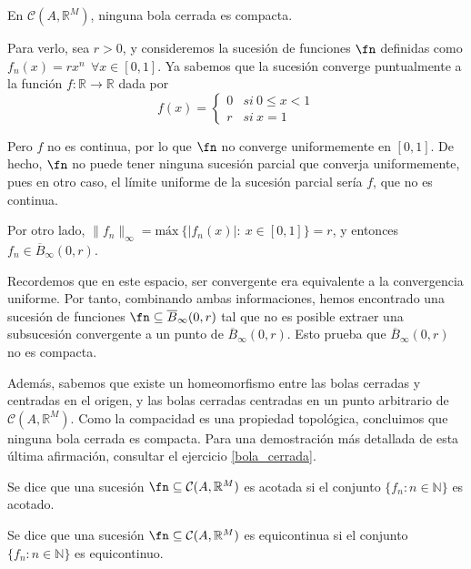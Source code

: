 \begin{ejemplo} En $\mathcal{C}(A,\mathbb{R}^M)$, ninguna bola cerrada es compacta.

  Para verlo, sea $r>0$, y consideremos la sucesión de funciones $\fn$ definidas como $f_n(x) = rx^n \ \ \forall x \in [0,1]$. Ya sabemos que la sucesión converge puntualmente a la función $f: \mathbb{R} \to \mathbb{R}$ dada por $$f(x) = \begin{cases} 0 & si\ 0 \le x < 1\\ r & si\ x = 1 \end{cases}$$

  Pero $f$ no es continua, por lo que $\fn$ no converge uniformemente en $[0,1]$. De hecho, $\fn$ no puede tener ninguna sucesión parcial que converja uniformemente, pues en otro caso, el límite uniforme de la sucesión parcial sería $f$, que no es continua.

  Por otro lado, $\|f_n\|_{\infty} = \text{máx} \ \{ |f_n(x)|:\ x \in [0,1]\} = r$, y entonces $f_n \in \overline{B}_{\infty}(0,r)$.

  Recordemos que en este espacio, ser convergente era equivalente a la convergencia uniforme. Por tanto, combinando ambas informaciones, hemos encontrado una sucesión de funciones $\fn \subseteq \overline{B}_{\infty}(0,r)$ tal que no es posible extraer una subsucesión convergente a un punto de $\overline{B}_{\infty}(0,r)$. Esto prueba que $\overline{B}_{\infty}(0,r)$ no es compacta.

  Además, sabemos que existe un homeomorfismo entre las bolas cerradas y centradas en el origen, y las bolas cerradas centradas en un punto arbitrario de $\mathcal{C}(A,\mathbb{R}^M)$. Como la compacidad es una propiedad topológica, concluimos que ninguna bola cerrada es compacta. Para una demostración más detallada de esta última afirmación, consultar el ejercicio \ref{bola_cerrada}.
\end{ejemplo}

\begin{ndef}
  Se dice que una sucesión $\fn \subseteq \mathcal{C}(A,\mathbb{R}^M)$ es acotada si el conjunto $\{ f_n: n \in \mathbb{N}\}$ es acotado.
\end{ndef}

\begin{ndef}
  Se dice que una sucesión $\fn \subseteq \mathcal{C}(A,\mathbb{R}^M)$ es equicontinua si el conjunto $\{ f_n: n \in \mathbb{N}\}$ es equicontinuo.
\end{ndef}

